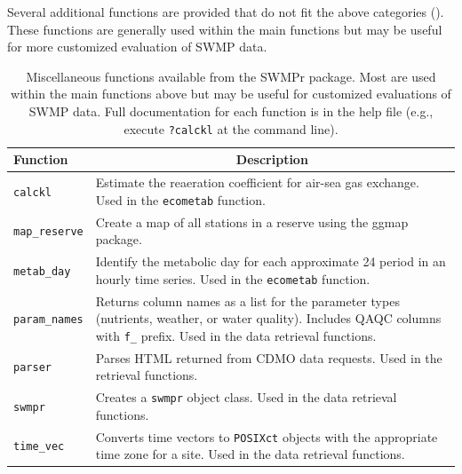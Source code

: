 \documentclass[10pt,letterpaper]{article}\usepackage[]{graphicx}\usepackage[]{color}
\begin{document}
Several additional functions are provided that do not fit the above categories ().  These functions are generally used within the main functions but may be useful for more customized evaluation of \ac{SWMP} data.  

\begin{table}[!tbp]
\caption{Miscellaneous functions available from the SWMPr package.  Most are used within the main functions above but may be useful for customized evaluations of \ac{SWMP} data.  Full documentation for each function is in the help file (e.g., execute \texttt{?calckl} at the command line).\label{tab:misc}} 
\begin{center}
\begin{tabular}{lp{3.5in}}
\hline\hline
\multicolumn{1}{l}{Function}&\multicolumn{1}{c}{Description}\tabularnewline
\hline
\texttt{calckl}&Estimate the reaeration coefficient for air-sea gas exchange.  Used in the \texttt{ecometab} function.\tabularnewline
\texttt{map\_reserve}&Create a map of all stations in a reserve using the ggmap package.\tabularnewline
\texttt{metab\_day}&Identify the metabolic day for each approximate 24 period in an hourly time series.  Used in the \texttt{ecometab} function.\tabularnewline
\texttt{param\_names}&Returns column names as a list for the parameter types (nutrients, weather, or water quality).  Includes \ac{QAQC} columns with \texttt{f\_} prefix. Used in the data retrieval functions.\tabularnewline
\texttt{parser}&Parses HTML returned from \ac{CDMO} data requests.  Used in the retrieval functions.\tabularnewline
\texttt{swmpr}&Creates a \texttt{swmpr} object class.  Used in the data retrieval functions.\tabularnewline
\texttt{time\_vec}&Converts time vectors to \texttt{POSIXct} objects with the appropriate time zone for a site.  Used in the data retrieval functions.\tabularnewline
\hline
\end{tabular}\end{center}

\end{table}
\end{document}
